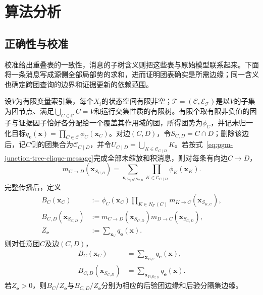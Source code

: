 \section{算法分析}
\label{sec:pgm-junction-tree-analysis}

\subsection{正确性与校准}
\label{sec:pgm-junction-tree-correctness}

校准给出重叠表的一致性，消息的子树含义则把这些表与原始模型联系起来。下面将一条消息写成源侧全部局部势的求和，进而证明团表确实是所需边缘；同一含义也确定跨团查询的边界和证据更新的依赖范围。

\begin{theorem}[子树消息与团边缘]
  \label{thm:pgm-junction-tree-correctness}
  设$V$为有限变量索引集，每个$X_i$的状态空间有限非空；$\mathcal{T}=(\mathcal{C},\mathcal{E}_{\mathcal T})$是以$V$的子集为团节点、满足$\bigcup_{C\in\mathcal C}C=V$和运行交集性质的有限树。有限个取有限非负值的因子与证据因子恰好各分配给一个覆盖其作用域的团，所得团势为$\phi_C$，并记未归一化目标$q_{\bm e}(\bm{x})=\prod_{C\in\mathcal C}\phi_C(\bm{x}_C)$。对边$(C,D)$，令$S_{C,D}=C\cap D$；删除该边后，记$C$侧的团集合为$\mathcal{C}_{C\mid D}$，并令$U_{C\mid D}=\bigcup_{K\in\mathcal{C}_{C\mid D}}K$。若按式~\eqref{eq:pgm-junction-tree-clique-message}完成全部未缩放和积消息，则对每条有向边$C\to D$，
  \begin{equation}
    m_{C\to D}(\bm{x}_{S_{C,D}})
      =\sum_{\bm{x}_{U_{C\mid D}\setminus S_{C,D}}}
         \prod_{K\in\mathcal{C}_{C\mid D}}\phi_K(\bm{x}_K).
    \label{eq:pgm-junction-tree-subtree-invariant}
  \end{equation}
  完整传播后，定义
  \[
    \begin{aligned}
      B_C(\bm{x}_C)&\mathrel{:=}
        \phi_C(\bm{x}_C)
        \prod_{K\in N_{\mathcal{T}}(C)}
          m_{K\to C}(\bm{x}_{S_{K,C}}),\\
      B_{C,D}(\bm{x}_{S_{C,D}})&\mathrel{:=}
        m_{C\to D}(\bm{x}_{S_{C,D}})
        m_{D\to C}(\bm{x}_{S_{C,D}}),\\
      Z_{\bm e}&\mathrel{:=}
        \sum_{\bm{x}_V}q_{\bm e}(\bm{x}).
    \end{aligned}
  \]
  则对任意团$C$及边$(C,D)$，
  \begin{equation}
    \begin{aligned}
      B_C(\bm{x}_C)
        &=\sum_{\bm{x}_{V\setminus C}}q_{\bm{e}}(\bm{x}),\\
      B_{C,D}(\bm{x}_{S_{C,D}})
        &=\sum_{\bm{x}_{V\setminus S_{C,D}}}q_{\bm{e}}(\bm{x}).
    \end{aligned}
    \label{eq:pgm-junction-tree-true-marginals}
  \end{equation}
  若$Z_{\bm e}>0$，则$B_C/Z_{\bm e}$与$B_{C,D}/Z_{\bm e}$分别为相应的后验团边缘和后验分隔集边缘。
\end{theorem}

